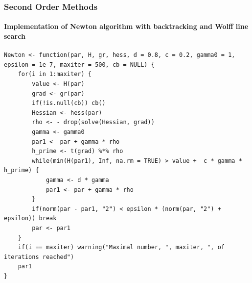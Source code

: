 \documentclass[aspectratio=169]{beamer}
\begin{document}
\begin{frame}[fragile]
    \frametitle{Second Order Methods}
    \framesubtitle{Implementation of Newton algorithm with backtracking and Wolff line search}
\begin{verbatim}
Newton <- function(par, H, gr, hess, d = 0.8, c = 0.2, gamma0 = 1, epsilon = 1e-7, maxiter = 500, cb = NULL) {
    for(i in 1:maxiter) {
        value <- H(par)
        grad <- gr(par)
        if(!is.null(cb)) cb()
        Hessian <- hess(par) 
        rho <- - drop(solve(Hessian, grad)) 
        gamma <- gamma0
        par1 <- par + gamma * rho
        h_prime <- t(grad) %*% rho 
        while(min(H(par1), Inf, na.rm = TRUE) > value +  c * gamma * h_prime) { 
            gamma <- d * gamma 
            par1 <- par + gamma * rho
        }
        if(norm(par - par1, "2") < epsilon * (norm(par, "2") + epsilon)) break
        par <- par1 
    }
    if(i == maxiter) warning("Maximal number, ", maxiter, ", of iterations reached")
    par1
}      
\end{verbatim}
\end{frame}
\end{document}
